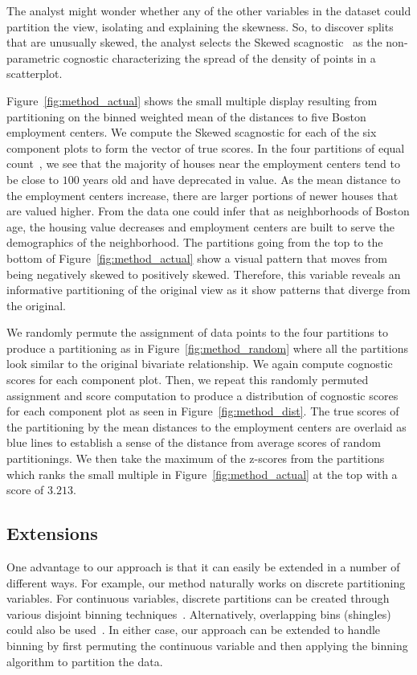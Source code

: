 The analyst might wonder whether any of the other variables in the dataset could partition the view, isolating and explaining the skewness. So, to discover splits that are unusually skewed, the analyst selects the Skewed scagnostic~\cite{Wilkinson2005} as the non-parametric cognostic characterizing the spread of the density of points in a scatterplot. 

Figure~\ref{fig:method_actual} shows the small multiple display resulting from partitioning on the binned weighted mean of the distances to five Boston employment centers. We compute the Skewed scagnostic for each of the six component plots to form the vector of true scores. In the four partitions of equal count~\cite{Becker1996}, we see that the majority of houses near the employment centers tend to be close to $100$ years old and have deprecated in value. As the mean distance to the employment centers increase, there are larger portions of newer houses that are valued higher. From the data one could infer that as neighborhoods of Boston age, the housing value decreases and employment centers are built to serve the demographics of the neighborhood. The partitions going from the top to the bottom of Figure~\ref{fig:method_actual} show a visual pattern that moves from being negatively skewed to positively skewed. Therefore, this variable reveals an informative partitioning of the original view as it show patterns that diverge from the original.

We randomly permute the assignment of data points to the four partitions to produce a partitioning as in Figure~\ref{fig:method_random} where all the partitions look similar to the original bivariate relationship. We again compute cognostic scores for each component plot. Then, we repeat this randomly permuted assignment and score computation to produce a distribution of cognostic scores for each component plot as seen in Figure~\ref{fig:method_dist}. The true scores of the partitioning by the mean distances to the employment centers are overlaid as blue lines to establish a sense of the distance from average scores of random partitionings. We then take the maximum of the z-scores from the partitions which ranks the small multiple in Figure~\ref{fig:method_actual} at the top with a score of $3.213$.

\subsection{Extensions}
One advantage to our approach is that it can easily be extended in a number of different ways. For example, our method naturally works on discrete partitioning variables. For continuous variables, discrete partitions can be created through various disjoint binning techniques~\cite{Freedman1981,Scott2009}. Alternatively, overlapping bins (shingles) could also be used~\cite{Becker1996}. In either case, our approach can be extended to handle binning by first permuting the continuous variable and then applying the binning algorithm to partition the data.

